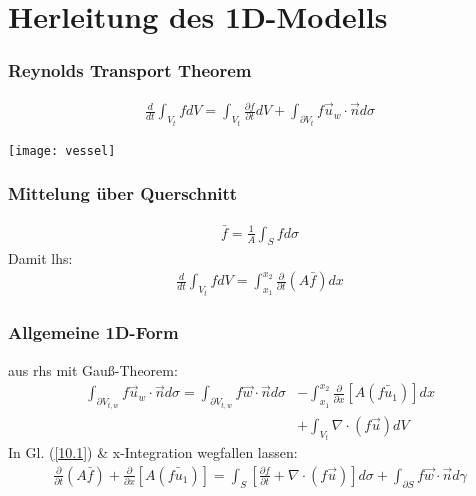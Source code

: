 \section{Herleitung des 1D-Modells}




\begin{frame}\frametitle{Reynolds Transport Theorem}

  \begin{align}
    \frac{d}{dt} \int_{V_t} f dV = \int_{V_t} \frac{\partial f}{\partial t}dV + \int_{\partial V_t} f \vec u_w \cdot \vec n d\sigma \label{10.1} %
  \end{align}

  \begin{center}
      \texttt{[image: vessel]}
  \end{center}

\end{frame}


\begin{frame}\frametitle{Mittelung über Querschnitt}


  \begin{align}
    \bar f = \frac{1}{A} \int_S f d\sigma %
  \end{align}
  Damit lhs:
  \begin{align}
    \frac{d}{dt} \int_{V_t} f dV = \int_{x_1}^{x_2} \frac{\partial}{\partial t} (A \bar f) dx %
  \end{align}

\end{frame}


\begin{frame}\frametitle{Allgemeine 1D-Form}
  aus rhs mit Gauß-Theorem:
  \begin{equation}
  \begin{aligned}
    \int_{\partial V_{t,w}} f \vec u_w \cdot \vec n d\sigma = \int_{\partial V_{t, w}} f \vec w \cdot \vec n d\sigma &- \int_{x_1}^{x_2} \frac{\partial}{\partial x} \left[  A (\bar{f u_1}) \right] dx \\&+ \int_{V_t} \nabla \cdot (f \vec u) dV
  \end{aligned} %
\end{equation} %
In Gl. (\ref{10.1}) \& x-Integration wegfallen lassen:
\begin{align}
\boxed{
\frac{\partial}{\partial t} (A \bar f) + \frac{\partial}{\partial x} \left[ A (\bar{f u_1}) \right] = \int_S \left[ \frac{\partial f}{\partial t}
+ \nabla \cdot (f\vec u) \right] d \sigma
+ \int_{\partial S} f \vec w \cdot \vec n d \gamma} %
\end{align}
\end{frame}

